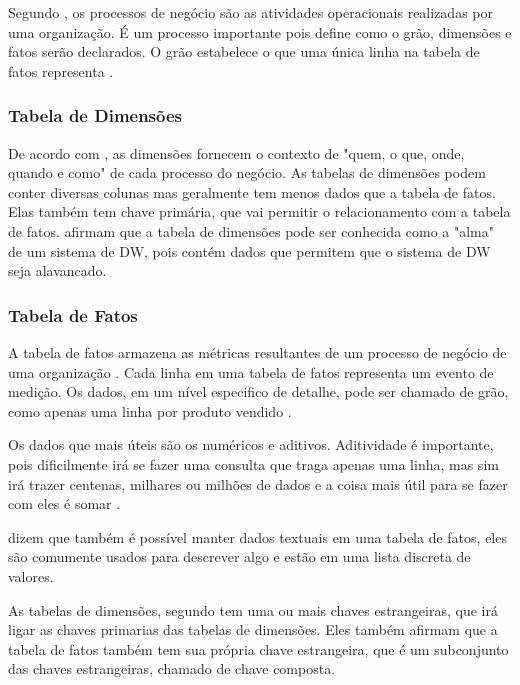 Segundo , os processos de negócio são as atividades operacionais realizadas por uma organização. É um processo importante pois define como o grão, dimensões e fatos serão declarados. O grão estabelece o que uma única linha na tabela de fatos representa \citep{kimball2013}.

\subsubsection{Tabela de Dimensões}
De acordo com , as dimensões fornecem o contexto de "quem, o que, onde, quando e como" de cada processo do negócio. As tabelas de dimensões podem conter diversas colunas mas geralmente tem menos dados que a tabela de fatos. Elas também tem chave primária, que vai permitir o relacionamento com a tabela de fatos.
 afirmam que a tabela de dimensões pode ser conhecida como a "alma" de um sistema de DW, pois contém dados que permitem que o sistema de DW seja alavancado.

\subsubsection{Tabela de Fatos}
A tabela de fatos armazena as métricas resultantes de um processo de negócio de uma organização . Cada linha em uma tabela de fatos representa um evento de medição. Os dados, em um nível especifico de detalhe, pode ser chamado de grão, como apenas uma linha por produto vendido \citep{kimball2013}.

Os dados que mais úteis são os numéricos e aditivos. Aditividade é importante, pois dificilmente irá se fazer uma consulta que traga apenas uma linha, mas sim irá trazer centenas, milhares ou milhões de dados e a coisa mais útil para se fazer com eles é somar \citep{kimball2013}.

 dizem que também é possível manter dados textuais em uma tabela de fatos, eles são comumente usados para descrever algo e estão em uma lista discreta de valores. 

As tabelas de dimensões, segundo  tem uma ou mais chaves estrangeiras, que irá ligar as chaves primarias das tabelas de dimensões. Eles também afirmam que a tabela de fatos também tem sua própria chave estrangeira, que é um subconjunto das chaves estrangeiras, chamado de chave composta. 

